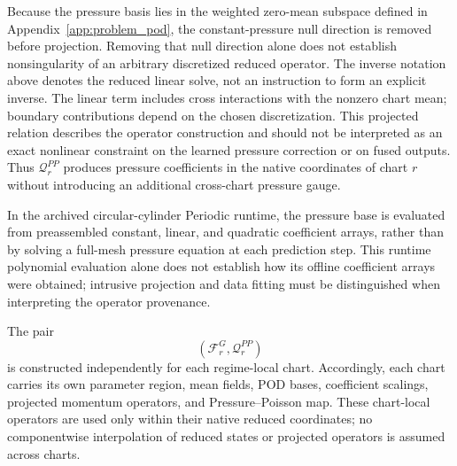 Because the pressure basis lies in the weighted zero-mean subspace defined in
Appendix~\ref{app:problem_pod}, the constant-pressure null direction is
removed before projection. Removing that null direction alone does not establish nonsingularity of an arbitrary discretized reduced operator. The inverse notation above denotes the reduced linear solve, not an instruction to form an explicit inverse. The linear term includes cross interactions with the nonzero chart mean; boundary contributions depend on the chosen discretization. This projected relation describes the operator construction and should not be interpreted as an exact nonlinear constraint on the learned pressure correction or on fused outputs.
Thus $\mathcal Q_r^{PP}$ produces pressure coefficients in the native
coordinates of chart $r$ without introducing an additional cross-chart
pressure gauge.

In the archived circular-cylinder Periodic runtime, the pressure base is evaluated from preassembled constant, linear, and quadratic coefficient arrays, rather than by solving a full-mesh pressure equation at each prediction step. This runtime polynomial evaluation alone does not establish how its offline coefficient arrays were obtained; intrusive projection and data fitting must be distinguished when interpreting the operator provenance.

The pair
\begin{equation}
    \left(
        \mathcal F_r^G,
        \mathcal Q_r^{PP}
    \right)
\end{equation}
is constructed independently for each regime-local chart.
Accordingly, each chart carries its own parameter region, mean fields,
POD bases, coefficient scalings, projected momentum operators, and
Pressure--Poisson map.
These chart-local operators are used only within their native reduced
coordinates; no componentwise interpolation of reduced states or projected
operators is assumed across charts.
